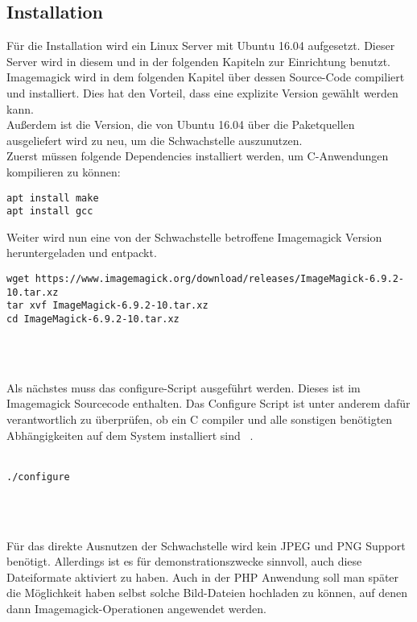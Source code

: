 \subsection{Installation}\label{subsec:installation}

Für die Installation wird ein Linux Server mit Ubuntu 16.04 aufgesetzt.
Dieser Server wird in diesem und in der folgenden Kapiteln zur Einrichtung benutzt.\\

Imagemagick wird in dem folgenden Kapitel über dessen Source-Code compiliert und installiert.
Dies hat den Vorteil, dass eine explizite Version gewählt werden kann.\\

Außerdem ist die Version, die von Ubuntu 16.04 über die Paketquellen ausgeliefert wird zu neu,
um die Schwachstelle auszunutzen.\\

Zuerst müssen folgende Dependencies installiert werden, um C-Anwendungen kompilieren zu können:
\begin{verbatim}
apt install make
apt install gcc
\end{verbatim}
\vspace{5mm}

Weiter wird nun eine von der Schwachstelle betroffene Imagemagick Version heruntergeladen und entpackt.
\begin{verbatim}
wget https://www.imagemagick.org/download/releases/ImageMagick-6.9.2-10.tar.xz
tar xvf ImageMagick-6.9.2-10.tar.xz
cd ImageMagick-6.9.2-10.tar.xz
\end{verbatim}\\\\
\vspace{5mm}

Als nächstes muss das configure-Script ausgeführt werden.
Dieses ist im Imagemagick Sourcecode enthalten.
Das Configure Script ist unter anderem dafür verantwortlich zu überprüfen,
ob ein C compiler und alle sonstigen benötigten Abhängigkeiten auf dem System installiert sind
~\cite{georgebrocklehurstMagicConfigureMake}.\\\\

\begin{verbatim}
./configure
\end{verbatim}\\\\
\vspace{5mm}


Für das direkte Ausnutzen der Schwachstelle wird kein JPEG und PNG Support benötigt.
Allerdings ist es für demonstrationszwecke sinnvoll, auch diese Dateiformate aktiviert zu haben.
Auch in der PHP Anwendung soll man später die Möglichkeit haben selbst solche Bild-Dateien hochladen zu können,
auf denen dann Imagemagick-Operationen angewendet werden.\\\\

